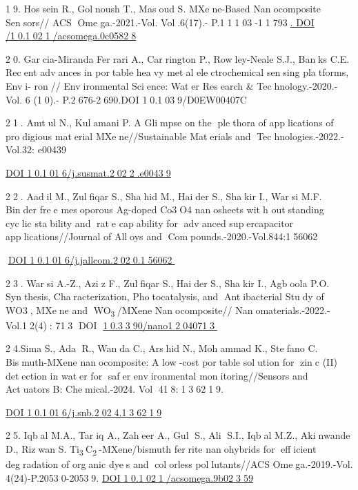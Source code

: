 {19. Hossein R., Golnoush T., Masoud S. MXene-Based Nanocomposite
Sensors// ACS Omega.-2021.-Vol. Vol.6(17).-
P.11103-11793\href{https://pubs.acs.org/doi/10.1021/acsomega.0c05828}{.
DOI /10.1021/acsomega.0c05828}

20. Garcia-Miranda Ferrari A., Carrington P., Rowley-Neale S.J.,
Banks C.E. Recent advances in portable heavy metal
electrochemical sensing platforms, Envi- ron// Environmental
Science: Water Research \& Technology.-2020.-Vol. 6 (10).-
P.2676-2690.DOI 10.1039/D0EW00407C

21. Amtul N., Kulamani P. A Glimpse on the plethora of
applications of prodigious material MXene//Sustainable Materials
and Technologies.-2022.-Vol.32: e00439

\href{https://doi.org/10.1016/j.susmat.2022.e00439}{DOI
10.1016/j.susmat.2022.e00439}

22. Aadil M., Zulfiqar S., Shahid M., Haider S., Shakir I.,
Warsi M.F. Binder free mesoporous Ag-doped Co3O4 nanosheets with
outstanding cyclic stability and rate capability for advanced
supercapacitor applications//Journal of Alloys and
Compounds.-2020.-Vol.844:156062

\href{https://doi.org/10.1016/j.jallcom.2020.156062}{DOI
10.1016/j.jallcom.2020.156062}

23. Warsi A.-Z., Aziz F., Zulfiqar S., Haider S., Shakir I.,
Agboola P.O. Synthesis, Characterization, Photocatalysis, and
Antibacterial Study of WO3, MXene and WO\textsubscript{3}/MXene
Nanocomposite// Nanomaterials.-2022.-Vol.12(4): 713 DOI
\href{http://dx.doi.org/10.3390/nano12040713}{10.3390/nano12040713}

24.Sima S., Ada R., Wanda C., Arshid N., Mohammad K., Stefano C.
Bismuth-MXene nanocomposite: A low-cost portable solution for
zinc (II) detection in water for safer environmental
monitoring//Sensors and Actuators B: Chemical.-2024. Vol
418:136219.

\href{https://doi.org/10.1016/j.snb.2024.136219}{DOI
10.1016/j.snb.2024.136219}

25. Iqbal M.A., Tariq A., Zaheer A., Gul S., Ali S.I., Iqbal
M.Z., Akinwande D., Rizwan S.
Ti\textsubscript{3}C\textsubscript{2}-MXene/bismuth ferrite
nanohybrids for efficient degradation of organic dyes and
colorless pollutants//ACS Omega.-2019.-Vol. 4(24)-P.20530-20539.
\href{https://doi.org/10.1021/acsomega.9b02359}{DOI
10.1021/acsomega.9b02359}

}

